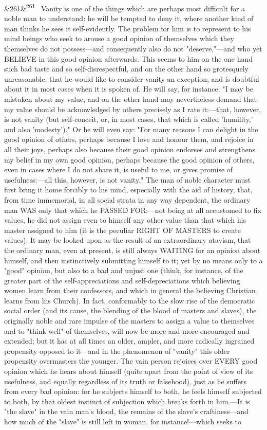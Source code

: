 \documentclass[12pt]{article}
\newcommand{\para}[1][]{\par\noindent\ifx&#1&\else\textsuperscript{\footnotesize #1}~\fi}
\begin{document}
\para[261] Vanity is one of the things which are perhaps most difficult for a noble man to understand: he will be tempted to deny it, where another kind of man thinks he sees it self-evidently. The problem for him is to represent to his mind beings who seek to arouse a good opinion of themselves which they themselves do not possess---and consequently also do not "deserve,"---and who yet BELIEVE in this good opinion afterwards. This seems to him on the one hand such bad taste and so self-disrespectful, and on the other hand so grotesquely unreasonable, that he would like to consider vanity an exception, and is doubtful about it in most cases when it is spoken of. He will say, for instance: "I may be mistaken about my value, and on the other hand may nevertheless demand that my value should be acknowledged by others precisely as I rate it:---that, however, is not vanity (but self-conceit, or, in most cases, that which is called 'humility,' and also 'modesty')." Or he will even say: "For many reasons I can delight in the good opinion of others, perhaps because I love and honour them, and rejoice in all their joys, perhaps also because their good opinion endorses and strengthens my belief in my own good opinion, perhaps because the good opinion of others, even in cases where I do not share it, is useful to me, or gives promise of usefulness:---all this, however, is not vanity." The man of noble character must first bring it home forcibly to his mind, especially with the aid of history, that, from time immemorial, in all social strata in any way dependent, the ordinary man WAS only that which he PASSED FOR:---not being at all accustomed to fix values, he did not assign even to himself any other value than that which his master assigned to him (it is the peculiar RIGHT OF MASTERS to create values). It may be looked upon as the result of an extraordinary atavism, that the ordinary man, even at present, is still always WAITING for an opinion about himself, and then instinctively submitting himself to it; yet by no means only to a "good" opinion, but also to a bad and unjust one (think, for instance, of the greater part of the self-appreciations and self-depreciations which believing women learn from their confessors, and which in general the believing Christian learns from his Church). In fact, conformably to the slow rise of the democratic social order (and its cause, the blending of the blood of masters and slaves), the originally noble and rare impulse of the masters to assign a value to themselves and to "think well" of themselves, will now be more and more encouraged and extended; but it has at all times an older, ampler, and more radically ingrained propensity opposed to it---and in the phenomenon of "vanity" this older propensity overmasters the younger. The vain person rejoices over EVERY good opinion which he hears about himself (quite apart from the point of view of its usefulness, and equally regardless of its truth or falsehood), just as he suffers from every bad opinion: for he subjects himself to both, he feels himself subjected to both, by that oldest instinct of subjection which breaks forth in him.---It is "the slave" in the vain man's blood, the remains of the slave's craftiness---and how much of the "slave" is still left in woman, for instance!---which seeks to 
\end{document}
